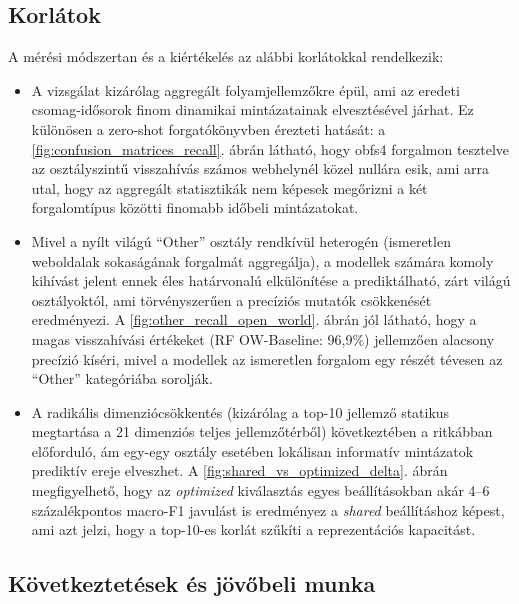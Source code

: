 \documentclass[a4paper,oneside]{article}
\begin{document}
\subsection{Korlátok}
A mérési módszertan és a kiértékelés az alábbi korlátokkal rendelkezik:
\begin{itemize}
    \item A vizsgálat kizárólag aggregált folyamjellemzőkre épül, ami az eredeti csomag-idősorok finom dinamikai mintázatainak elvesztésével járhat. Ez különösen a zero-shot forgatókönyvben érezteti hatását: a \ref{fig:confusion_matrices_recall}. ábrán látható, hogy obfs4 forgalmon tesztelve az osztályszintű visszahívás számos webhelynél közel nullára esik, ami arra utal, hogy az aggregált statisztikák nem képesek megőrizni a két forgalomtípus közötti finomabb időbeli mintázatokat.
\item Mivel a nyílt világú ``Other'' osztály rendkívül heterogén (ismeretlen weboldalak sokaságának forgalmát aggregálja), a modellek számára komoly kihívást jelent ennek éles határvonalú elkülönítése a prediktálható, zárt világú osztályoktól, ami törvényszerűen a precíziós mutatók csökkenését eredményezi. A \ref{fig:other_recall_open_world}. ábrán jól látható, hogy a magas visszahívási értékeket (RF OW-Baseline: 96,9\%) jellemzően alacsony precízió kíséri, mivel a modellek az ismeretlen forgalom egy részét tévesen az ``Other'' kategóriába sorolják.
\item A radikális dimenziócsökkentés (kizárólag a top-10 jellemző statikus megtartása a 21 dimenziós teljes jellemzőtérből) következtében a ritkábban előforduló, ám egy-egy osztály esetében lokálisan informatív mintázatok prediktív ereje elveszhet. A \ref{fig:shared_vs_optimized_delta}. ábrán megfigyelhető, hogy az \textit{optimized} kiválasztás egyes beállításokban akár 4--6 százalékpontos macro-F1 javulást is eredményez a \textit{shared} beállításhoz képest, ami azt jelzi, hogy a top-10-es korlát szűkíti a reprezentációs kapacitást.
\end{itemize}

\subsection{Következtetések és jövőbeli munka}
\label{sec:kovetkeztetesek}
\end{document}
